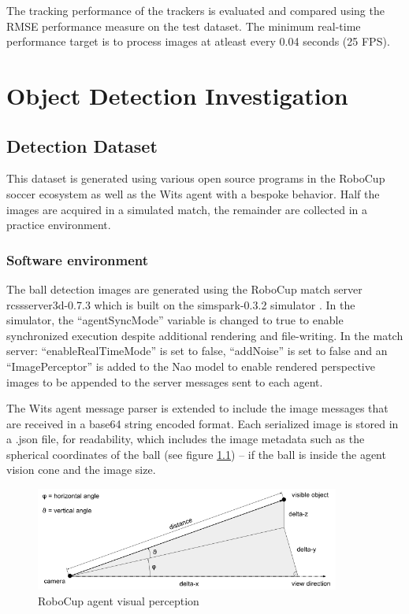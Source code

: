 \documentclass[a4paper,twoside,12pt]{report}
\begin{document}
The tracking performance of the trackers is evaluated and compared using the RMSE performance measure on the test dataset. The minimum real-time performance target is to process images at atleast every 0.04 seconds (25 FPS).
\chapter{Object Detection Investigation}

\section{Detection Dataset}
This dataset is generated using various open source programs in the RoboCup soccer ecosystem as well as the Wits agent with a bespoke behavior. Half the images are acquired in a simulated match, the remainder are collected in a practice environment.

\subsection{Software environment}
The ball detection images are generated using the RoboCup match server rcssserver3d-0.7.3 which is built on the simspark-0.3.2 simulator  \citep{perceptors}. In the simulator, the ``agentSyncMode'' variable is changed to true to enable synchronized execution despite additional rendering and file-writing. In the match server: ``enableRealTimeMode'' is set to false, ``addNoise'' is set to false and an ``ImagePerceptor'' is added to the Nao model to enable rendered perspective images to be appended to the server messages sent to each agent.  

The Wits agent message parser is extended to include the image messages that are received in a base64 string encoded format. Each serialized image is stored in a .json file, for readability, which includes the image metadata such as the spherical coordinates of the ball (see figure \ref{fig:spherical}) -- if the ball is inside the agent vision cone and the image size. 

\begin{figure}[h!]
\begin{center}
\includegraphics[width=10cm]{images/Vision_Perception.png}
\caption{RoboCup agent visual perception \citep{perceptors}}
\label{fig:spherical}
\end{center}
\end{figure}
\end{document}
